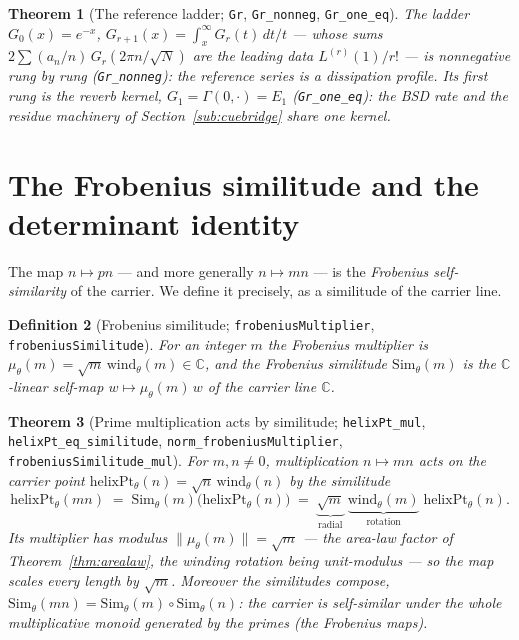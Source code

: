 \documentclass[11pt]{article}
\newtheorem{definition}{Definition}[section]
\newtheorem{theorem}[definition]{Theorem}
\newcommand{\C}{\mathbb{C}}
\newcommand{\code}[1]{\texttt{#1}}
\begin{document}
\begin{theorem}[The reference ladder; \code{Gr}, \code{Gr\_nonneg}, \code{Gr\_one\_eq}]\label{thm:grladder}
The ladder $G_0(x)=e^{-x}$, $G_{r+1}(x)=\int_x^\infty G_r(t)\,dt/t$ --- whose sums
$2\sum(a_n/n)\,G_r(2\pi n/\sqrt N)$ are the leading data $L^{(r)}(1)/r!$ --- is nonnegative rung by
rung (\code{Gr\_nonneg}): the reference series is a dissipation profile.  Its first rung is the
reverb kernel, $G_1=\Gamma(0,\cdot)=E_1$ (\code{Gr\_one\_eq}): the BSD rate and the residue
machinery of Section~\ref{sub:cuebridge} share one kernel.
\end{theorem}

\section{The Frobenius similitude and the determinant identity}\label{sec:det}

The map $n\mapsto pn$ --- and more generally $n\mapsto mn$ --- is the \emph{Frobenius
self-similarity} of the carrier. We define it precisely, as a similitude of the carrier line.

\begin{definition}[Frobenius similitude; \code{frobeniusMultiplier}, \code{frobeniusSimilitude}]\label{def:simil}
For an integer $m$ the \emph{Frobenius multiplier} is
$\mu_\theta(m)=\sqrt m\,\mathrm{wind}_\theta(m)\in\C$, and the \emph{Frobenius similitude}
$\mathrm{Sim}_\theta(m)$ is the $\C$-linear self-map $w\mapsto\mu_\theta(m)\,w$ of the carrier line $\C$.
\end{definition}

\begin{theorem}[Prime multiplication acts by similitude; \code{helixPt\_mul}, \code{helixPt\_eq\_similitude}, \code{norm\_frobeniusMultiplier}, \code{frobeniusSimilitude\_mul}]\label{thm:simil}
For $m,n\neq0$, multiplication $n\mapsto mn$ acts on the carrier point
$\mathrm{helixPt}_\theta(n)=\sqrt n\,\mathrm{wind}_\theta(n)$ by the similitude
\[
  \mathrm{helixPt}_\theta(mn) \;=\; \mathrm{Sim}_\theta(m)\bigl(\mathrm{helixPt}_\theta(n)\bigr)
   \;=\; \underbrace{\sqrt m}_{\text{radial}}\;\underbrace{\mathrm{wind}_\theta(m)}_{\text{rotation}}\;\mathrm{helixPt}_\theta(n).
\]
Its multiplier has modulus $\lVert\mu_\theta(m)\rVert=\sqrt m$ --- the area-law factor of
Theorem~\ref{thm:arealaw}, the winding rotation being unit-modulus --- so the map scales every length
by $\sqrt m$. Moreover the similitudes \emph{compose},
$\mathrm{Sim}_\theta(mn)=\mathrm{Sim}_\theta(m)\circ\mathrm{Sim}_\theta(n)$: the carrier is
\emph{self-similar} under the whole multiplicative monoid generated by the primes (the Frobenius maps).
\end{theorem}
\end{document}
